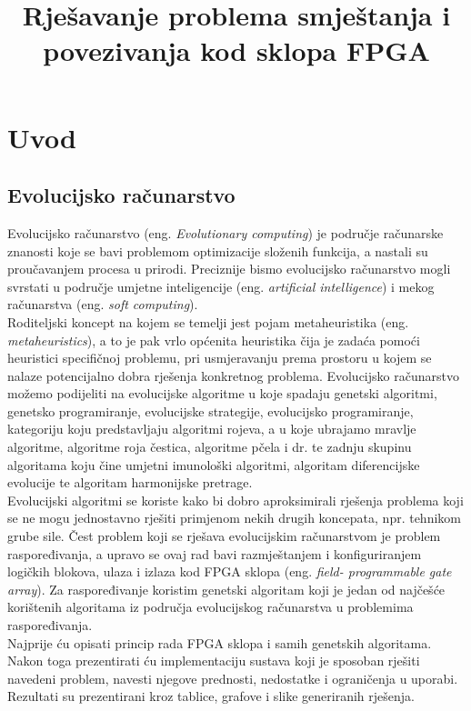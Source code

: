 \documentclass[times, utf8, zavrsni]{fer}
\begin{document}
	
	
	\title{Rješavanje problema smještanja i povezivanja kod sklopa FPGA}
	
	\zahvala{}
	
	\tableofcontents
	
	\chapter{Uvod}
	
	\section{Evolucijsko računarstvo}
	
	Evolucijsko računarstvo (eng. \emph{Evolutionary computing}) je područje računarske znanosti koje se bavi problemom optimizacije složenih funkcija, a nastali su proučavanjem procesa u prirodi. Preciznije bismo evolucijsko računarstvo mogli svrstati u područje umjetne inteligencije (eng. \emph{artificial intelligence}) i mekog računarstva (eng. \emph{soft computing}).\\Roditeljski koncept na kojem se temelji jest pojam metaheuristika (eng. \emph{metaheuristics}), a to je pak vrlo općenita heuristika čija je zadaća pomoći heuristici specifičnoj problemu, pri usmjeravanju prema prostoru u kojem se nalaze potencijalno dobra rješenja konkretnog problema. Evolucijsko računarstvo možemo podijeliti na evolucijske algoritme u koje spadaju genetski algoritmi, genetsko programiranje, evolucijske strategije, evolucijsko programiranje, kategoriju koju predstavljaju algoritmi rojeva, a u koje ubrajamo mravlje algoritme, algoritme roja čestica, algoritme pčela i dr. te zadnju skupinu algoritama koju čine umjetni imunološki algoritmi, algoritam diferencijske evolucije te algoritam harmonijske pretrage.\\
	Evolucijski algoritmi se koriste kako bi dobro aproksimirali rješenja problema koji se ne mogu jednostavno rješiti primjenom nekih drugih koncepata, npr. tehnikom grube sile. Čest problem koji se rješava evolucijskim računarstvom je problem raspoređivanja, a upravo se ovaj rad bavi razmještanjem i konfiguriranjem logičkih blokova, ulaza i izlaza kod FPGA sklopa (eng. \emph{field- programmable gate array}). Za raspoređivanje koristim genetski algoritam koji je jedan od najčešće korištenih algoritama iz područja evolucijskog računarstva u problemima raspoređivanja.\\
	Najprije ću opisati princip rada FPGA sklopa i samih genetskih algoritama. Nakon toga prezentirati ću implementaciju sustava koji je sposoban rješiti navedeni problem, navesti njegove prednosti, nedostatke i ograničenja u uporabi. Rezultati su prezentirani kroz tablice, grafove i slike generiranih rješenja. 
	
\end{document}
